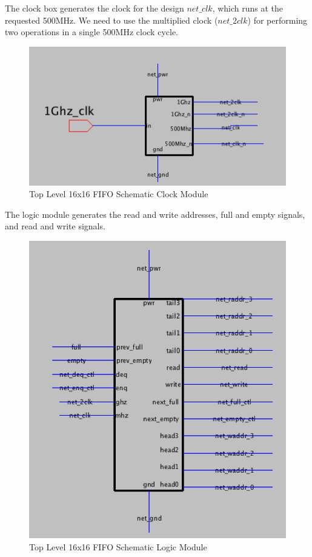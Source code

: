 \documentclass[a4paper]{article}
\begin{document}
The clock box generates the clock for the design $net\_clk$, which runs at the requested 500MHz. We need to use the multiplied clock ($net\_2clk$) for performing two operations in a single 500MHz clock cycle. 

\begin{figure}[H]
	\centering
	\includegraphics[scale=0.65]{topLevelSchematicClockBox}
	\caption{Top Level 16x16 FIFO Schematic Clock Module}
	\label{fig:topLevelSchematicClockBox}
\end{figure}

The logic module generates the read and write addresses, full and empty signals, and read and write signals.

\begin{figure}[H]
	\centering
	\includegraphics[scale=0.65]{topLevelSchematicLogic}
	\caption{Top Level 16x16 FIFO Schematic Logic Module}
	\label{fig:topLevelSchematicLogic}
\end{figure}
\end{document}
